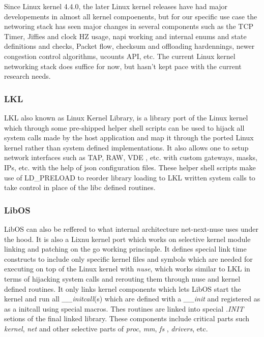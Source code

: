 \documentclass{sig-alternate}
\begin{document}
Since Linux kernel 4.4.0, the later Linux kernel releases have had major developements in almost all kernel compoenents, but for our specific use case
the networing stack has seen major changes in several components such as the TCP Timer, Jiffies and clock HZ usage, napi working and internal enums 
and state definitions and checks, Packet flow, checksum and offloading hardennings, newer congestion control algorithms, ucounts API, etc. 
The current Linux kernel networking stack does suffice for now, but hasn't kept pace with the current research needs. 

\subsubsection{LKL}
LKL also known as Linux Kernel Library, is a library port of the Linux kernel which through some pre-shipped helper shell scripts can be used to hijack
all system calls made by the host application and map it through the ported Linux kernel rather than system defined implementations. It also allows one 
to setup network interfaces such as TAP, RAW, VDE , etc. with custom gateways, masks, IPs, etc. with the help of json configuration files. These helper
shell scripts make use of LD\_PRELOAD to reorder library loading to LKL written system calls to take control in place of the libc defined routines.

\subsubsection{LibOS}
LibOS can also be reffered to what internal architecture net-next-nuse uses under the hood. It is also a Lixnu kernel port which works on selective 
kernel module linking and patching on the go working princinple. It defines special link time constructs to include only specific kernel files and 
symbols which are needed for executing on top of the Linux kernel with \textit{nuse}, which works similar to LKL in terms of hijacking system calls 
and rerouting them through nuse and kernel defined routines. It only links kernel components which lets LibOS start the kernel and run all \textit{\_\_initcall}(s)
which are defined with a \textit{\_\_init} and registered as as a initcall using special macros. Thes routines are linked into special \textit{.INIT} 
setions of the final linked library. These components include critical parts such \textit{kernel}, \textit{net} and other selective parts of \textit{proc},
\textit{mm}, \textit{fs} , \textit{drivers}, etc. 
\end{document}
